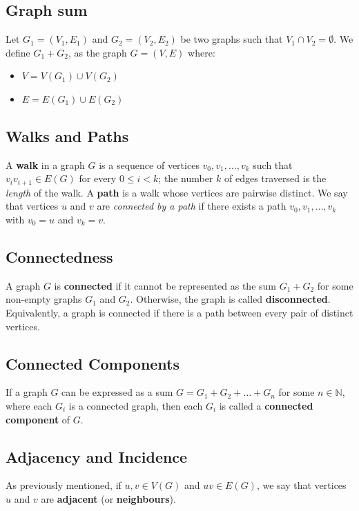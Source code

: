 \documentclass[docmute]{article}
\begin{document}
\subsection*{Graph sum}
Let \(G_1 = (V_1, E_1)\) and \(G_2 = (V_2, E_2)\) be two graphs such that  \(V_1 \cap V_2 = \emptyset\). We define \(G_1 + G_2\), as the graph \(G = (V,E)\) where:
\begin{itemize}
    \item \(V = V(G_1) \cup V(G_2)\)
    \item \(E = E(G_1) \cup E(G_2)\)
\end{itemize}

\subsection*{Walks and Paths}
A \textbf{walk} in a graph \(G\) is a sequence of vertices \(v_0, v_1, \dots, v_k\) such that \(v_i v_{i+1} \in E(G)\) for every \(0 \le i < k\); the number \(k\) of edges traversed is the \emph{length} of the walk. A \textbf{path} is a walk whose vertices are pairwise distinct. We say that vertices \(u\) and \(v\) are \emph{connected by a path} if there exists a path \(v_0, v_1, \dots, v_k\) with \(v_0 = u\) and \(v_k = v\).

\subsection*{Connectedness}
A graph \(G\) is \textbf{connected} if it cannot be represented as the sum \(G_1 + G_2\) for some non-empty graphs \(G_1\) and \(G_2\). Otherwise, the graph is called \textbf{disconnected}.
Equivalently, a graph is connected if there is a path between every pair of distinct vertices.

\subsection*{Connected Components}
If a graph \(G\) can be expressed as a sum \(G = G_1 + G_2 + \dots + G_n\) for some \(n \in \mathbb{N}\), where each \(G_i\) is a connected graph, then each \(G_i\) is called a \textbf{connected component} of \(G\).

\subsection*{Adjacency and Incidence}
As previously mentioned, if \(u,v \in V(G)\) and \(uv \in E(G)\), we say that vertices \(u\) and \(v\) are \textbf{adjacent} (or \textbf{neighbours}).
\end{document}
